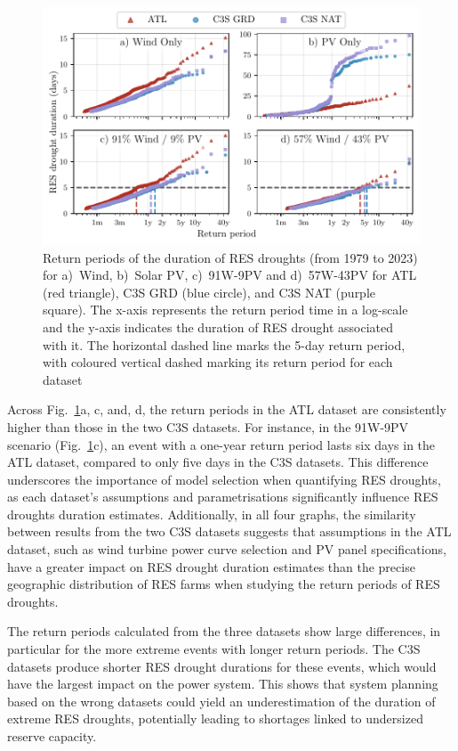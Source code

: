 \documentclass[preprint, 12pt]{elsarticle}
\begin{document}
\begin{figure}[!ht]
	\centering
	\includegraphics[width=\textwidth]{droughts_return_periods.pdf}
	\caption{Return periods of the duration of RES droughts  (from 1979 to 2023) for a)~Wind, b)~Solar PV, c)~91W-9PV and d)~57W-43PV for ATL (red triangle), C3S GRD (blue circle), and C3S NAT (purple square). The x-axis represents the return period time in a log-scale and the y-axis indicates the duration of RES drought associated with it. The horizontal dashed line marks the 5-day return period, with coloured vertical dashed marking its return period for each dataset}
	\label{fig:return_periods}
\end{figure}

Across Fig.~\ref{fig:return_periods}a, c, and, d, the return periods in the ATL dataset are consistently higher than those in the two C3S datasets. For instance, in the 91W-9PV scenario (Fig.~\ref{fig:return_periods}c), an event with a one-year return period lasts six days in the ATL dataset, compared to only five days in the C3S datasets. This difference underscores the importance of model selection when quantifying RES droughts, as each dataset’s assumptions and parametrisations significantly influence RES droughts duration estimates. Additionally, in all four graphs, the similarity between results from the two C3S datasets suggests that assumptions in the ATL dataset, such as wind turbine power curve selection and PV panel specifications, have a greater impact on RES drought duration estimates than the precise geographic distribution of RES farms when studying the return periods of RES droughts.

The return periods calculated from the three datasets show large differences, in particular for the more extreme events with longer return periods. The C3S datasets produce shorter RES drought durations for these events, which would have the largest impact on the power system. This shows that system planning based on the wrong datasets could yield an underestimation of the duration of extreme RES droughts, potentially leading to shortages linked to undersized reserve capacity.
\end{document}
